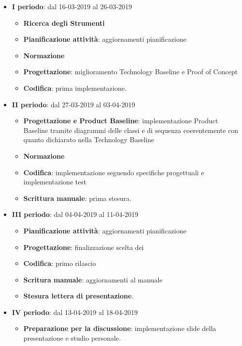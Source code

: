 		\begin{itemize}
			\item \textbf{I periodo}: dal 16-03-2019 al 26-03-2019
			\begin{itemize}
    	        \item \textbf{Ricerca degli Strumenti}
    	        \item \textbf{Pianificazione attività}: aggiornamenti pianificazione
    	        \item \textbf{Normazione}
    	        \item \textbf{Progettazione}: miglioramento Technology Baseline e Proof of Concept
    	        \item \textbf{Codifica}: prima implementazione.
        	\end{itemize}
			\item \textbf{II periodo}: dal 27-03-2019 al 03-04-2019
			\begin{itemize}
				\item \textbf{Progettazione e Product Baseline}: implementazione Product Baseline tramite diagrammi delle classi e di sequenza
				coerentemente con quanto dichiarato nella Technology Baseline
    	        \item \textbf{Normazione}
    	        \item \textbf{Codifica}: implementazione seguendo specifiche progettuali e implementazione test
    	        \item \textbf{Scrittura manuale}: prima stesura.
        	\end{itemize}
        	\item \textbf{III periodo}: dal 04-04-2019 al 11-04-2019
			\begin{itemize}
				\item \textbf{Pianificazione attività}: aggiornamenti pianificazione
    	        \item \textbf{Progettazione}: finalizzazione scelta dei 
    	        \item \textbf{Codifica}: primo rilascio
    	        \item \textbf{Scritura manuale}: aggiornamenti al manuale
    	        \item \textbf{Stesura lettera di presentazione}.
        	\end{itemize}
        	\item \textbf{IV periodo}: dal 13-04-2019 al 18-04-2019
			\begin{itemize}
				\item \textbf{Preparazione per la discussione}: implementazione slide della presentazione e studio personale.
        	\end{itemize}
        \end{itemize}


